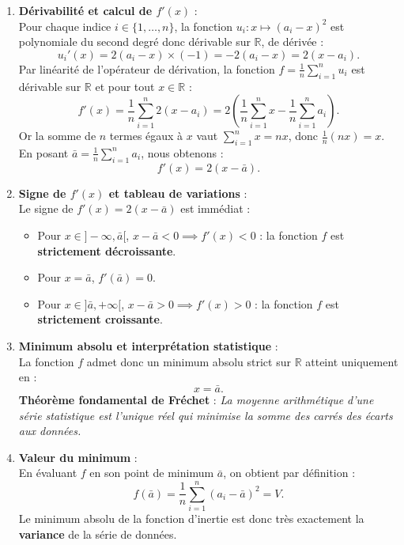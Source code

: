 \documentclass[11pt,a4paper]{article}
\newcommand{\R}{\mathbb{R}}
\begin{document}
\begin{correctionbox}
\begin{enumerate}[label=\textbf{\arabic*.}]
    \item \textbf{Dérivabilité et calcul de $f'(x)$} :\\
    Pour chaque indice $i \in \{1, \dots, n\}$, la fonction $u_i : x \mapsto (a_i - x)^2$ est polynomiale du second degré donc dérivable sur $\R$, de dérivée :
    \[
    u_i'(x) = 2(a_i - x) \times (-1) = -2(a_i - x) = 2(x - a_i).
    \]
    Par linéarité de l'opérateur de dérivation, la fonction $f = \frac{1}{n}\sum_{i=1}^n u_i$ est dérivable sur $\R$ et pour tout $x \in \R$ :
    \[
    f'(x) = \frac{1}{n} \sum_{i=1}^n 2(x - a_i) = 2 \left( \frac{1}{n} \sum_{i=1}^n x - \frac{1}{n} \sum_{i=1}^n a_i \right).
    \]
    Or la somme de $n$ termes égaux à $x$ vaut $\sum_{i=1}^n x = n x$, donc $\frac{1}{n}(nx) = x$.\\
    En posant $\bar{a} = \frac{1}{n}\sum_{i=1}^n a_i$, nous obtenons :
    \[
    f'(x) = 2(x - \bar{a}).
    \]

    \item \textbf{Signe de $f'(x)$ et tableau de variations} :\\
    Le signe de $f'(x) = 2(x - \bar{a})$ est immédiat :
    \begin{itemize}
        \item Pour $x \in ]-\infty, \bar{a}[$, $x - \bar{a} < 0 \implies f'(x) < 0$ : la fonction $f$ est \textbf{strictement décroissante}.
        \item Pour $x = \bar{a}$, $f'(\bar{a}) = 0$.
        \item Pour $x \in ]\bar{a}, +\infty[$, $x - \bar{a} > 0 \implies f'(x) > 0$ : la fonction $f$ est \textbf{strictement croissante}.
    \end{itemize}

    \item \textbf{Minimum absolu et interprétation statistique} :\\
    La fonction $f$ admet donc un minimum absolu strict sur $\R$ atteint uniquement en :
    \[
    x = \bar{a}.
    \]
    \textbf{Théorème fondamental de Fréchet} : \emph{La moyenne arithmétique d'une série statistique est l'unique réel qui minimise la somme des carrés des écarts aux données.}

    \item \textbf{Valeur du minimum} :\\
    En évaluant $f$ en son point de minimum $\bar{a}$, on obtient par définition :
    \[
    f(\bar{a}) = \frac{1}{n} \sum_{i=1}^n (a_i - \bar{a})^2 = V.
    \]
    Le minimum absolu de la fonction d'inertie est donc très exactement la \textbf{variance} de la série de données.


\end{enumerate}
\end{correctionbox}
\end{document}
